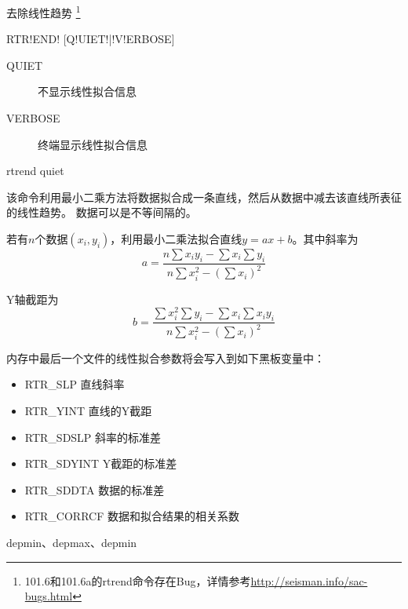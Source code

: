 \label{cmd:rtrend}

去除线性趋势
\footnote{101.6和101.6a的rtrend命令存在Bug，详情参考\url{http://seisman.info/sac-bugs.html}}

\begin{SACSTX}
RTR!END! [Q!UIET!|!V!ERBOSE]
\end{SACSTX}

\begin{description}
\item [QUIET] 不显示线性拟合信息
\item [VERBOSE] 终端显示线性拟合信息
\end{description}

\begin{SACDFT}
rtrend quiet
\end{SACDFT}

该命令利用最小二乘方法将数据拟合成一条直线，然后从数据中减去该直线所表征的线性趋势。
数据可以是不等间隔的。

若有$n$个数据$(x_i,y_i)$，利用最小二乘法拟合直线$y=ax+b$。其中斜率为
\[
    a = \frac{n\sum x_i y_i - \sum x_i \sum y_i}
    {n\sum x_i^2 - (\sum x_i)^2}
\]

Y轴截距为
\[
    b = \frac{\sum x_i^2 \sum y_i - \sum x_i \sum x_i y_i}
    {n\sum x_i^2 - (\sum x_i)^2}
\]

内存中最后一个文件的线性拟合参数将会写入到如下黑板变量中：
\begin{itemize}
\item RTR\_SLP 直线斜率
\item RTR\_YINT 直线的Y截距
\item RTR\_SDSLP 斜率的标准差
\item RTR\_SDYINT Y截距的标准差
\item RTR\_SDDTA 数据的标准差
\item RTR\_CORRCF 数据和拟合结果的相关系数
\end{itemize}

depmin、depmax、depmin
